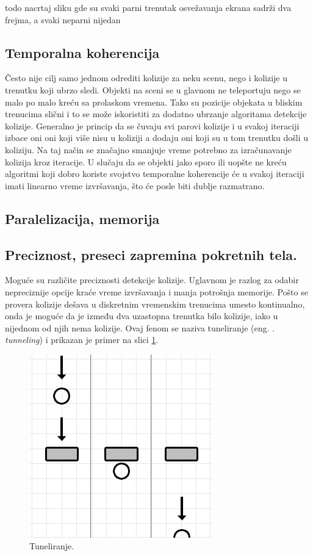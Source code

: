 \documentclass{article}
\begin{document}
{todo nacrtaj sliku gde su svaki parni trenutak osvežavanja ekrana sadrži dva frejma, a svaki neparni 
nijedan


\subsection{Temporalna koherencija}

Često nije cilj samo jednom odrediti kolizije za neku scenu, nego i kolizije u trenutku koji ubrzo sledi.
Objekti na sceni se u glavnom ne teleportuju nego se malo po malo kreću sa prolaskom vremena.
Tako su pozicije objekata u bliskim trenucima slični i to se može iskoristiti za dodatno ubrzanje algoritama 
detekcije kolizije. Generalno je princip da se čuvaju svi parovi kolizije i u svakoj iteraciji 
izbace oni oni koji više nisu u koliziji a dodaju oni koji su u tom trenutku došli u koliziju.
Na taj način se značajno smanjuje vreme potrebno za izračunavanje kolizija kroz iteracije.
U slučaju da se objekti jako sporo ili uopšte ne kreću algoritmi koji dobro koriste svojstvo temporalne 
koherencije će u svakoj iteraciji imati linearno vreme izvršavanja, što će posle biti dublje razmatrano. 

\subsection{Paralelizacija, memorija}

\subsection{Preciznost, preseci zapremina pokretnih tela.}

Moguće su različite preciznosti detekcije kolizije. 
Uglavnom je razlog za odabir nepreciznije opcije kraće vreme izvršavanja i manja potrošnja memorije.
Pošto se provera kolizije dešava u diskretnim vremenskim trenucima umesto kontinualno, onda je moguće da 
je između dva uzastopna trenutka bilo kolizije, iako u nijednom od njih nema kolizije. 
Ovaj fenom se naziva tuneliranje (eng. {\em. tunneling}) i prikazan je primer na slici \ref{fig:tunnel}. 

\begin{figure}[h!]
	\begin{center}
	\includegraphics[scale=0.45]{tunnel.png}
	\end{center}
	\caption{Tuneliranje.}
	\label{fig:tunnel}
\end{figure}

}
\end{document}

